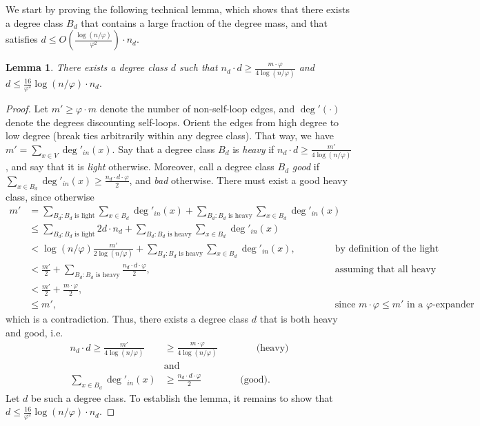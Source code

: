 \documentclass[letterpaper,11pt]{article}
\theoremstyle{plain}
\newtheorem{lemma}[theorem]{Lemma}
\theoremstyle{definition}
\theoremstyle{remark}
\begin{document}
We start by proving the following technical lemma, which shows that there exists a degree class $B_d$ that contains a large fraction of the degree mass, 
and that satisfies $d \leq  O\left(\frac{\log(n/\varphi)}{\varphi^2}\right) \cdot n_d$. 
\begin{lemma}\label{lemma:heavy_and_good}
    There exists a degree class $d$ such that $n_d \cdot d \geq \frac{m \cdot \varphi}{4\log(n/\varphi)}$ and  $d \leq \frac{16}{\varphi^2} \log (n/\varphi) \cdot n_d.$
\end{lemma} 
\begin{proof}
    Let $m' \geq \varphi\cdot  m$ denote the number of non-self-loop edges, and $\deg'(\cdot)$ denote the degrees discounting self-loops.
    Orient the edges from high degree to low degree (break ties arbitrarily within any degree class). 
     That way, we have $m' = \sum_{x \in V} \deg'_{in}(x)$. Say that a degree class $B_d$ is \emph{heavy} if $ n_d \cdot d \geq \frac{m'}{4\log(n /\varphi)}$, and say that it is \emph{light} otherwise. Moreover, call a degree class $B_d$ \emph{good} if $\sum_{x \in B_d} \deg'_{in}(x) \geq \frac{n_d \cdot d \cdot \varphi }{2}$, and {\em bad} otherwise. There must exist a good heavy class, since otherwise
    \begin{align*}
        m' &= \sum_{B_d: B_d\text{ is light}} \sum_{x \in B_d} \deg'_{in}(x) + \sum_{B_d: B_d\text{ is heavy}} \sum_{x \in B_d} \deg'_{in}(x) &  \\
        & \leq \sum_{B_d: B_d\text{ is light}} 2d \cdot n_d +  \sum_{B_d: B_d\text{ is heavy}} \sum_{x \in B_d} \deg'_{in}(x) \\
      & < \log(n /\varphi) \frac{m'}{2\log(n /\varphi)} +  \sum_{B_d: B_d\text{ is heavy}} \sum_{x \in B_d} \deg'_{in}(x), &\text{by definition of the light classes}\\
        & < \frac{m'}{2} + \sum_{B_d: B_d\text{ is heavy}}\frac{n_d \cdot d  \cdot \varphi }{2}, & \text{assuming that all heavy classes are bad} \\
         & < \frac{m'}{2} + \frac{m \cdot \varphi}{2}, & \\
        & \leq  m', & \text{since $m \cdot \varphi \leq m' $ in a $\varphi$-expander}
    \end{align*}
    which is a contradiction. Thus, there exists a degree class $d$ that is both heavy and good, i.e.
\begin{equation*}
\begin{split}
n_d \cdot d \geq \frac{m'}{4\log(n /\varphi)} &\geq \frac{m\cdot \varphi }{4\log(n /\varphi) } \qquad \qquad \text{(heavy)}\\
&\text{and}\\
\sum_{x \in B_d} \deg'_{in}(x) &\geq \frac{n_d \cdot d \cdot \varphi}{2 } \qquad \qquad \text{(good)}.
\end{split}
\end{equation*}
Let $d$ be such a degree class. To establish the lemma, it remains to show that $d \leq \frac{16}{\varphi^2} \log (n/\varphi) \cdot n_d$.


\end{proof}
\end{document}
